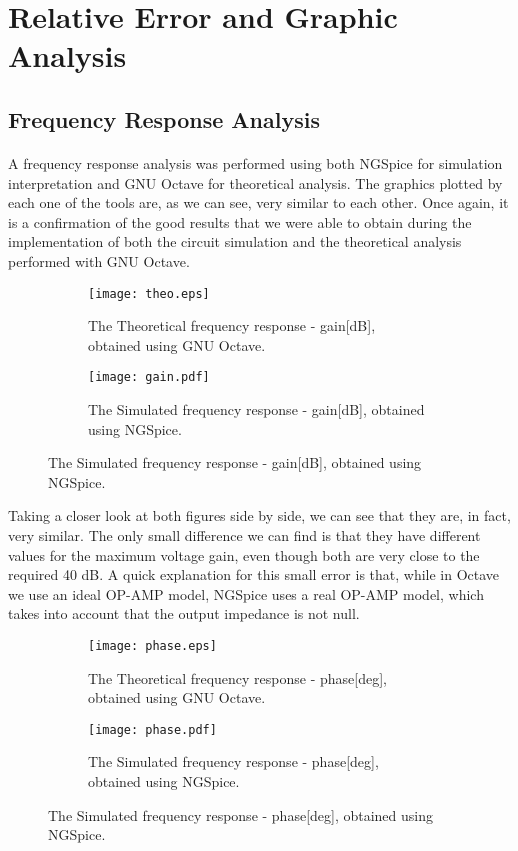 \section{Relative Error and Graphic Analysis}
\label{error}

\subsection{Frequency Response Analysis}
\label{subsec:freqresp}

\paragraph{}
A frequency response analysis was performed using both NGSpice for simulation interpretation and GNU Octave for theoretical analysis. The graphics plotted by each one of the tools are, as we can see, very similar to each other. Once again, it is a confirmation of the good results that we were able to obtain during the implementation of both the circuit simulation and the theoretical analysis performed with GNU Octave.

\begin{figure}[H]
\begin{subfigure}{0.5\textwidth}
\texttt{[image: theo.eps]} 
\caption{The Theoretical frequency response - gain[dB], obtained using GNU Octave.}
\label{fig:theo_third}
\end{subfigure}
\begin{subfigure}{0.5\textwidth}
\texttt{[image: gain.pdf]}
\caption{The Simulated frequency response - gain[dB], obtained using NGSpice.}
\label{fig:total}
\end{subfigure}
\end{figure}

Taking a closer look at both figures side by side, we can see that they are, in fact, very similar. The only small difference we can find is that they have different values for the maximum voltage gain, even though both are very close to the required 40 dB. A quick explanation for this small error is that, while in Octave we use an ideal OP-AMP model, NGSpice uses a real OP-AMP model, which takes into account that the output impedance is not null.

\begin{figure}[H]
\begin{subfigure}{0.5\textwidth}
\texttt{[image: phase.eps]} 
\caption{The Theoretical frequency response - phase[deg], obtained using GNU Octave.}
\label{fig:theo_fourth}
\end{subfigure}
\begin{subfigure}{0.5\textwidth}
\texttt{[image: phase.pdf]}
\caption{The Simulated frequency response - phase[deg], obtained using NGSpice.}
\label{fig:theo_fifth}
\end{subfigure}
\end{figure}

